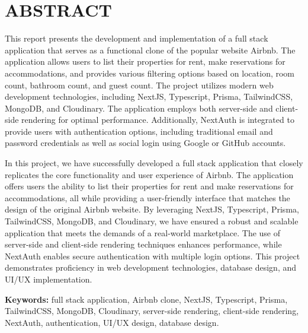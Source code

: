 \chapter*{\centering ABSTRACT}

This report presents the development and implementation of a full stack application that serves as a functional clone of the popular website Airbnb. The application allows users to list their properties for rent, make reservations for accommodations, and provides various filtering options based on location, room count, bathroom count, and guest count. The project utilizes modern web development technologies, including NextJS, Typescript, Prisma, TailwindCSS, MongoDB, and Cloudinary. The application employs both server-side and client-side rendering for optimal performance. Additionally, NextAuth is integrated to provide users with authentication options, including traditional email and password credentials as well as social login using Google or GitHub accounts.

In this project, we have successfully developed a full stack application that closely replicates the core functionality and user experience of Airbnb. The application offers users the ability to list their properties for rent and make reservations for accommodations, all while providing a user-friendly interface that matches the design of the original Airbnb website. By leveraging NextJS, Typescript, Prisma, TailwindCSS, MongoDB, and Cloudinary, we have ensured a robust and scalable application that meets the demands of a real-world marketplace. The use of server-side and client-side rendering techniques enhances performance, while NextAuth enables secure authentication with multiple login options. This project demonstrates proficiency in web development technologies, database design, and UI/UX implementation.

\textbf{Keywords:} full stack application, Airbnb clone, NextJS, Typescript, Prisma, TailwindCSS, MongoDB, Cloudinary, server-side rendering, client-side rendering, NextAuth, authentication, UI/UX design, database design.